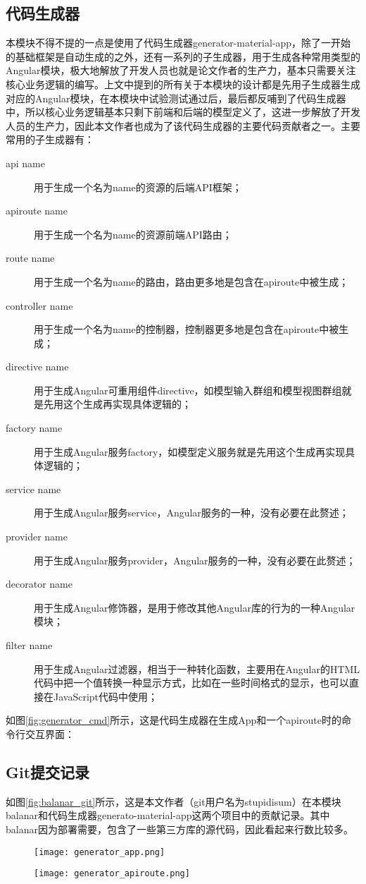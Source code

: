 \subsection{代码生成器}
本模块不得不提的一点是使用了代码生成器generator-material-app，除了一开始的基础框架是自动生成的之外，还有一系列的子生成器，用于生成各种常用类型的Angular模块，极大地解放了开发人员也就是论文作者的生产力，基本只需要关注核心业务逻辑的编写。上文中提到的所有关于本模块的设计都是先用子生成器生成对应的Angular模块，在本模块中试验测试通过后，最后都反哺到了代码生成器中，所以核心业务逻辑基本只剩下前端和后端的模型定义了，这进一步解放了开发人员的生产力，因此本文作者也成为了该代码生成器的主要代码贡献者之一。主要常用的子生成器有：
\begin{description}
  \item[api name] 用于生成一个名为name的资源的后端API框架；
  \item[apiroute name] 用于生成一个名为name的资源前端API路由；
  \item[route name] 用于生成一个名为name的路由，路由更多地是包含在apiroute中被生成；
  \item[controller name] 用于生成一个名为name的控制器，控制器更多地是包含在apiroute中被生成；
  \item[directive name] 用于生成Angular可重用组件directive，如模型输入群组和模型视图群组就是先用这个生成再实现具体逻辑的；
  \item[factory name] 用于生成Angular服务factory，如模型定义服务就是先用这个生成再实现具体逻辑的；
  \item[service name] 用于生成Angular服务service，Angular服务的一种，没有必要在此赘述；
  \item[provider name] 用于生成Angular服务provider，Angular服务的一种，没有必要在此赘述；
  \item[decorator name] 用于生成Angular修饰器，是用于修改其他Angular库的行为的一种Angular模块；
  \item[filter name] 用于生成Angular过滤器，相当于一种转化函数，主要用在Angular的HTML代码中把一个值转换一种显示方式，比如在一些时间格式的显示，也可以直接在JavaScript代码中使用；
\end{description}

如图\ref{fig:generator_cmd}所示，这是代码生成器在生成App和一个apiroute时的命令行交互界面：
\subsection{Git提交记录}
如图\ref{fig:balanar_git}所示，这是本文作者（git用户名为stupidisum）在本模块balanar和代码生成器generato-material-app这两个项目中的贡献记录。其中balanar因为部署需要，包含了一些第三方库的源代码，因此看起来行数比较多。
\begin{figure}[!htp]
 \centering
 \texttt{[image: generator\_app.png]}

 \vspace{0.1cm}

 \texttt{[image: generator\_apiroute.png]}
\end{figure}

